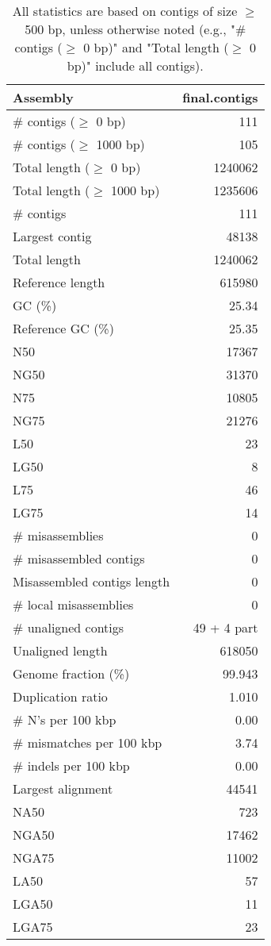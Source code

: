 \documentclass[12pt,a4paper]{article}
\begin{document}
\begin{table}[ht]
\begin{center}
\caption{All statistics are based on contigs of size $\geq$ 500 bp, unless otherwise noted (e.g., "\# contigs ($\geq$ 0 bp)" and "Total length ($\geq$ 0 bp)" include all contigs).}
\begin{tabular}{|l*{1}{|r}|}
\hline
Assembly & final.contigs \\ \hline
\# contigs ($\geq$ 0 bp) & 111 \\ \hline
\# contigs ($\geq$ 1000 bp) & 105 \\ \hline
Total length ($\geq$ 0 bp) & 1240062 \\ \hline
Total length ($\geq$ 1000 bp) & 1235606 \\ \hline
\# contigs & 111 \\ \hline
Largest contig & 48138 \\ \hline
Total length & 1240062 \\ \hline
Reference length & 615980 \\ \hline
GC (\%) & 25.34 \\ \hline
Reference GC (\%) & 25.35 \\ \hline
N50 & 17367 \\ \hline
NG50 & 31370 \\ \hline
N75 & 10805 \\ \hline
NG75 & 21276 \\ \hline
L50 & 23 \\ \hline
LG50 & 8 \\ \hline
L75 & 46 \\ \hline
LG75 & 14 \\ \hline
\# misassemblies & 0 \\ \hline
\# misassembled contigs & 0 \\ \hline
Misassembled contigs length & 0 \\ \hline
\# local misassemblies & 0 \\ \hline
\# unaligned contigs & 49 + 4 part \\ \hline
Unaligned length & 618050 \\ \hline
Genome fraction (\%) & 99.943 \\ \hline
Duplication ratio & 1.010 \\ \hline
\# N's per 100 kbp & 0.00 \\ \hline
\# mismatches per 100 kbp & 3.74 \\ \hline
\# indels per 100 kbp & 0.00 \\ \hline
Largest alignment & 44541 \\ \hline
NA50 & 723 \\ \hline
NGA50 & 17462 \\ \hline
NGA75 & 11002 \\ \hline
LA50 & 57 \\ \hline
LGA50 & 11 \\ \hline
LGA75 & 23 \\ \hline
\end{tabular}
\end{center}
\end{table}
\end{document}
